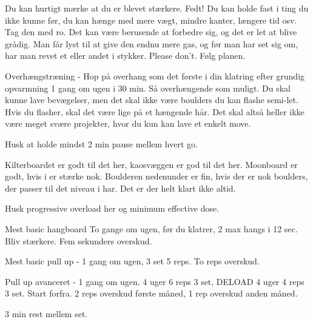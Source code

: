 \begin{multicols}{2}
  Du kan hurtigt mærke at du er blevet stærkere. Fedt! Du kan holde
  fast i ting du ikke kunne før, du kan hænge med mere vægt, mindre
  kanter, længere tid osv. Tag den med ro. Det kan være berusende at
  forbedre sig, og det er let at blive grådig. Man får lyst til at
  give den endnu mere gas, og før man har set sig om, har man revet
  et eller andet i stykker. Please don't. Følg planen.

  Overhængstræning - Hop på overhang som det første i din klatring
  efter grundig opvarmning 1 gang om ugen i 30 min. Så overhængende
  som muligt. Du skal kunne lave bevægelser, men det skal ikke være
  boulders du kan flashe semi-let. Hvis du flasher, skal det være
  lige på et hængende hår. Det skal altså heller ikke være meget
  svære projekter, hvor du kun kan lave et enkelt move.

  Husk at holde mindst 2 min pause mellem hvert go.

  Kilterboardet er godt til det her, kaosvæggen er god til det her.
  Moonboard er godt, hvis i er stærke nok. Boulderen nedenunder er
  fin, hvis der er nok boulders, der passer til det niveau i har. Det
  er der helt klart ikke altid.

  Husk progressive overload her og minimum effective dose.

  Mest basic hangboard To gange om ugen, før du klatrer, 2 max hangs
  i 12 sec. Bliv stærkere. Fem sekunders overskud.

  Mest basic pull up - 1 gang om ugen, 3 set 5 reps. To reps overskud.

  Pull up avanceret - 1 gang om ugen. 4 uger 6 reps 3 set, DELOAD 4
  uger 4 reps 3 set. Start forfra. 2 reps overskud første måned, 1
  rep overskud anden måned.

  3 min rest mellem set.

\end{multicols}
